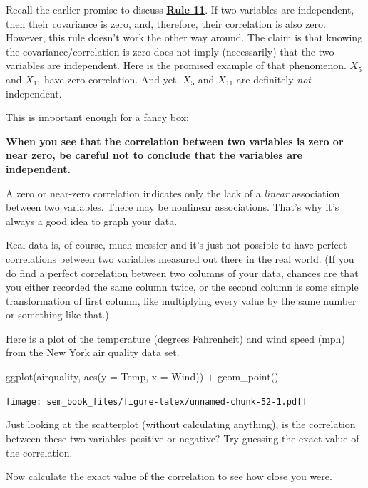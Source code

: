 \documentclass[
]{book}
\newenvironment{Shaded}{\begin{snugshade}}{\end{snugshade}}
\newcommand{\AttributeTok}[1]{\textcolor[rgb]{0.77,0.63,0.00}{#1}}
\newcommand{\FunctionTok}[1]{\textcolor[rgb]{0.00,0.00,0.00}{#1}}
\newcommand{\NormalTok}[1]{#1}
\newcommand{\SpecialCharTok}[1]{\textcolor[rgb]{0.00,0.00,0.00}{#1}}
\begin{document}
Recall the earlier promise to discuss \protect\hyperlink{Rule11}{\textbf{Rule 11}}. If two variables are independent, then their covariance is zero, and, therefore, their correlation is also zero. However, this rule doesn't work the other way around. The claim is that knowing the covariance/correlation is zero does not imply (necessarily) that the two variables are independent. Here is the promised example of that phenomenon. \(X_{5}\) and \(X_{11}\) have zero correlation. And yet, \(X_{5}\) and \(X_{11}\) are definitely \emph{not} independent.

This is important enough for a fancy box:

\textbf{When you see that the correlation between two variables is zero or near zero, be careful not to conclude that the variables are independent.}

A zero or near-zero correlation indicates only the lack of a \emph{linear} association between two variables. There may be nonlinear associations. That's why it's always a good idea to graph your data.

Real data is, of course, much messier and it's just not possible to have perfect correlations between two variables measured out there in the real world. (If you do find a perfect correlation between two columns of your data, chances are that you either recorded the same column twice, or the second column is some simple transformation of first column, like multiplying every value by the same number or something like that.)

Here is a plot of the temperature (degrees Fahrenheit) and wind speed (mph) from the New York air quality data set.

\begin{Shaded}
\begin{Highlighting}[]
\FunctionTok{ggplot}\NormalTok{(airquality, }\FunctionTok{aes}\NormalTok{(}\AttributeTok{y =}\NormalTok{ Temp, }\AttributeTok{x =}\NormalTok{ Wind)) }\SpecialCharTok{+}
    \FunctionTok{geom\_point}\NormalTok{()}
\end{Highlighting}
\end{Shaded}

\texttt{[image: sem\_book\_files/figure-latex/unnamed-chunk-52-1.pdf]}

Just looking at the scatterplot (without calculating anything), is the correlation between these two variables positive or negative? Try guessing the exact value of the correlation.

Now calculate the exact value of the correlation to see how close you were.
\end{document}
